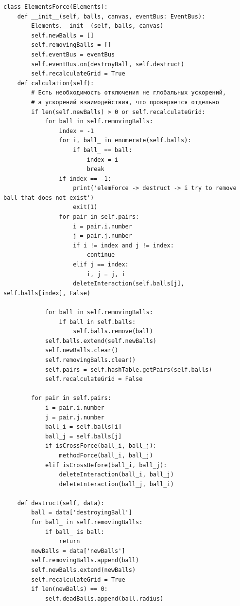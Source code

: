 \documentclass[utf8x, 14pt, oneside, a4paper]{article}
\begin{document}
\begin{lstlisting}
class ElementsForce(Elements):
    def __init__(self, balls, canvas, eventBus: EventBus):
        Elements.__init__(self, balls, canvas)
        self.newBalls = []
        self.removingBalls = []
        self.eventBus = eventBus
        self.eventBus.on(destroyBall, self.destruct)
        self.recalculateGrid = True
    def calculation(self):
        # Есть необходимость отключения не глобальных ускорений,
        # а ускорений взаимодействия, что проверяется отдельно
        if len(self.newBalls) > 0 or self.recalculateGrid:
            for ball in self.removingBalls:
                index = -1
                for i, ball_ in enumerate(self.balls):
                    if ball_ == ball:
                        index = i
                        break
                if index == -1:
                    print('elemForce -> destruct -> i try to remove ball that does not exist')
                    exit(1)
                for pair in self.pairs:
                    i = pair.i.number
                    j = pair.j.number
                    if i != index and j != index:
                        continue
                    elif j == index:
                        i, j = j, i
                    deleteInteraction(self.balls[j], self.balls[index], False)

            for ball in self.removingBalls:
                if ball in self.balls:
                    self.balls.remove(ball)
            self.balls.extend(self.newBalls)
            self.newBalls.clear()
            self.removingBalls.clear()
            self.pairs = self.hashTable.getPairs(self.balls)
            self.recalculateGrid = False

        for pair in self.pairs:
            i = pair.i.number
            j = pair.j.number
            ball_i = self.balls[i]
            ball_j = self.balls[j]
            if isCrossForce(ball_i, ball_j):
                methodForce(ball_i, ball_j)
            elif isCrossBefore(ball_i, ball_j):
                deleteInteraction(ball_i, ball_j)
                deleteInteraction(ball_j, ball_i)

    def destruct(self, data):
        ball = data['destroyingBall']
        for ball_ in self.removingBalls:
            if ball_ is ball:
                return
        newBalls = data['newBalls']
        self.removingBalls.append(ball)
        self.newBalls.extend(newBalls)
        self.recalculateGrid = True
        if len(newBalls) == 0:
            self.deadBalls.append(ball.radius)


\end{lstlisting}
\end{document}
